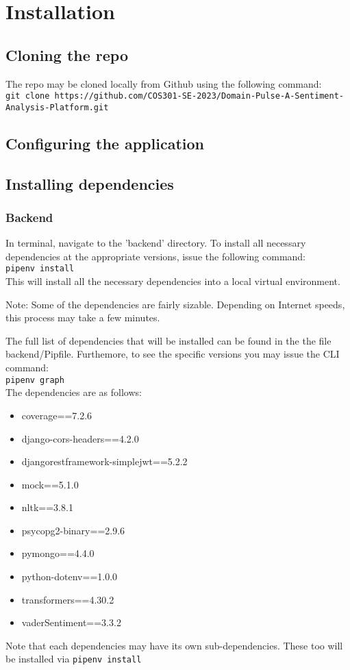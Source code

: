 \documentclass{article}
\newcommand{\code}[1]{\colorbox{light-gray}{\texttt{#1}}}
\begin{document}
\section{Installation}

\subsection{Cloning the repo}
The repo may be cloned locally from Github using the following command: \\
\code{git clone https://github.com/COS301-SE-2023/Domain-Pulse-A-Sentiment-Analysis-Platform.git}


\subsection{Configuring the application}


\subsection{Installing dependencies}
\subsubsection{Backend}
In terminal, navigate to the 'backend' directory. To install all necessary dependencies at the appropriate versions, issue the following
command: \\
\code{pipenv install}\\
This will install all the necessary dependencies into a local virtual environment.

Note: Some of the dependencies are fairly sizable. Depending on Internet speeds, this process may take a few minutes.

The full list of dependencies that will be installed can be found in the the file backend/Pipfile. Furthemore, to see the specific versions you may issue the CLI command:\\
\code{pipenv graph} \\
The dependencies are as follows:
\begin{itemize}
    \item coverage==7.2.6
    \item django-cors-headers==4.2.0
    \item djangorestframework-simplejwt==5.2.2
    \item mock==5.1.0
    \item nltk==3.8.1
    \item psycopg2-binary==2.9.6
    \item pymongo==4.4.0
    \item python-dotenv==1.0.0
    \item transformers==4.30.2
    \item vaderSentiment==3.3.2
\end{itemize}
Note that each dependencies may have its own sub-dependencies. These too will be installed via \code{pipenv install}
\end{document}
